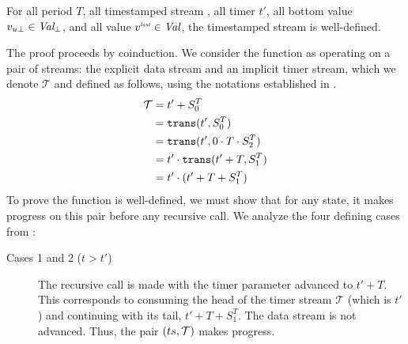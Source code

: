 \begin{lemma}
    For all period $T$, all timestamped stream \ts, all timer $t'$, all bottom value
    $v_{u\bot} \in \textit{Val}_\bot$, and all value $v^{\textit{\tiny last}} \in \textit{Val}$, the timestamped stream
     is well-defined.
\end{lemma}
\begin{skippableproof}
    The proof proceeds by coinduction. We consider the function  as operating on a pair
    of streams: the explicit data stream \ts and an implicit timer stream, which we denote
    $\mathcal{T}$ and defined as follows, using the notations established in
    .
    \begin{equation*}
        \begin{split}
            \mathcal{T} & = t' + S_0^T                                \\
                        & = \texttt{trans}(t', S_0^T)                 \\
                        & = \texttt{trans}(t', 0 \cdot T \cdot S_2^T) \\
                        & = t' \cdot \texttt{trans}(t' + T, S_1^T)    \\
                        & = t' \cdot (t'+T + S_1^T)
        \end{split}
    \end{equation*}
    To prove the function is well-defined, we must show that for any state, it makes progress on
    this pair before any recursive call. We analyze the four defining cases from
    :
    \begin{description}
        \item[Cases 1 and 2 ($t > t'$)] The recursive call is made with the timer parameter advanced
              to $t' + T$. This corresponds to consuming the head of the timer stream $\mathcal{T}$
              (which is $t'$) and continuing with its tail, $t'+T + S_1^T$. The data stream \ts is
              not advanced. Thus, the pair $(ts, \mathcal{T})$ makes progress.


\end{description}
\end{skippableproof}
